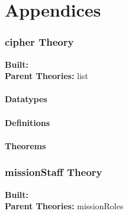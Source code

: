 \message{ !name(secureMessages.tex)}\documentclass[10pt,twoside]{article}
\begin{document}
\part*{Appendices}
\label{part:appendicies}

\HOLpagestyle

\section{cipher Theory}
\begin{flushleft}
\textbf{Built:} \HOLcipherDate \\[2pt]
\textbf{Parent Theories:} list
\end{flushleft}

\subsection{Datatypes}

\HOLcipherDatatypes

\subsection{Definitions}

\HOLcipherDefinitions

\subsection{Theorems}

\HOLcipherTheorems

\section{missionStaff Theory}
\begin{flushleft}
\textbf{Built:} \HOLmissionStaffDate \\[2pt]
\textbf{Parent Theories:} missionRoles
\end{flushleft}
\end{document}
